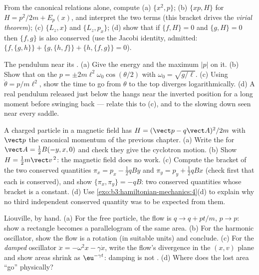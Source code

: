 \begin{exercise}[$\star$]\label{exo:b3:hamiltonian-mechanics:4}
From the canonical relations alone, compute (a) $\{x^2, p\}$; (b)
$\{xp, H\}$ for $H = p^2/2m + E_p(x)$, and interpret the two terms
(this bracket drives the \emph{virial theorem}); (c) $\{L_z, x\}$ and
$\{L_z, p_x\}$; (d) show that if $\{f, H\} = 0$ and $\{g, H\} = 0$
then $\{f, g\}$ is also conserved (use the Jacobi identity, admitted:
$\{f,\{g,h\}\} + \{g,\{h,f\}\} + \{h,\{f,g\}\} = 0$).
\end{exercise}

\begin{exercise}[$\star\star$]\label{exo:b3:hamiltonian-mechanics:5}
The pendulum near its . (a) Give the  energy and
the maximum $|p|$ on it. (b) Show that on the  $p =
\pm 2m\ell^2\omega_0\cos(\theta/2)$ with $\omega_0 = \sqrt{g/\ell}$.
(c) Using $\dot\theta = p/m\ell^2$, show the time to go from $\theta$
to the top diverges logarithmically. (d) A real pendulum released just
below the  hangs near the inverted position for a long
moment before swinging back --- relate this to (c), and to the
slowing down seen near every saddle.
\end{exercise}

\begin{exercise}[$\star\star$]\label{exo:b3:hamiltonian-mechanics:6}
A charged particle in a magnetic field has $H = (\vect p -
q\vect A)^2/2m$ with $\vect p$ the canonical momentum of the previous
chapter. (a) Write the  for $\vect A = \tfrac12
B(-y, x, 0)$ and check they give the cyclotron motion. (b) Show $H =
\tfrac12 m\vect v^{\,2}$: the magnetic field does no work. (c) Compute
the bracket of the two conserved quantities $\pi_x = p_x - \tfrac12
qBy$ and $\pi_y = p_y + \tfrac12 qBx$ (check first that each is
conserved), and show $\{\pi_x, \pi_y\} = -qB$: two conserved
quantities whose bracket is a constant. (d) Use
\cref{exo:b3:hamiltonian-mechanics:4}(d) to explain why no third
independent conserved quantity was to be expected from them.
\end{exercise}

\begin{exercise}[$\star\star$]\label{exo:b3:hamiltonian-mechanics:7}
Liouville, by hand. (a) For the free particle, the flow is $q \to q +
pt/m$, $p \to p$: show a rectangle becomes a parallelogram of the same
area. (b) For the harmonic oscillator, show the flow is a rotation
(in suitable units) and conclude. (c) For the \emph{damped} oscillator
$\ddot x = -\omega^2x - \gamma\dot x$, write the flow's divergence in
the $(x, v)$ plane and show areas shrink as $\eu^{-\gamma t}$: damping
is not . (d) Where does the lost area ``go'' physically?
\end{exercise}

